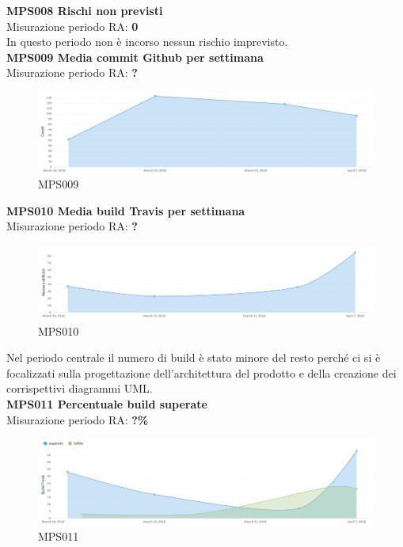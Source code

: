 \documentclass[PianoDiQualifica.tex]{subfiles}
\begin{document}
\textbf{MPS008 Rischi non previsti}\\
Misurazione periodo RA: \textbf{0}\\
In questo periodo non è incorso nessun rischio imprevisto.\\


\textbf{MPS009 Media commit Github per settimana}\\
Misurazione periodo RA: \textbf{?}
\begin{figure}[H]
	\centering
	\includegraphics[width=1\linewidth]{RQ/MPS009}
	\caption{MPS009}
	\label{fig:processi}
\end{figure}

\newpage

\textbf{MPS010 Media build Travis per settimana}\\
Misurazione periodo RA: \textbf{?}
\begin{figure}[H]
	\centering
	\includegraphics[width=1\linewidth]{RQ/MPS010}
	\caption{MPS010}
	\label{fig:processi}
\end{figure}
Nel periodo centrale il numero di build è stato minore del resto perché ci si è focalizzati sulla progettazione dell'architettura del prodotto e della creazione dei corrispettivi diagrammi UML.\\


\textbf{MPS011 Percentuale build superate}\\
Misurazione periodo RA: \textbf{?\%}
\begin{figure}[H]
	\centering
	\includegraphics[width=1\linewidth]{RQ/MPS011}
	\caption{MPS011}
	\label{fig:processi}
\end{figure}
\end{document}
